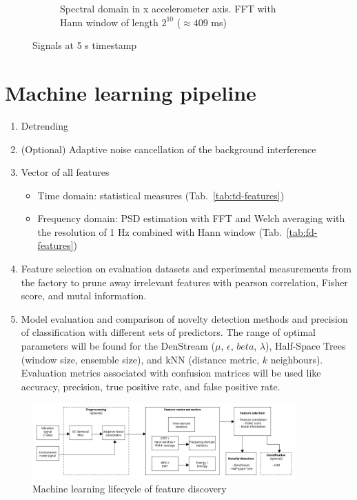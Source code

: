 \begin{figure}[ht]
\begin{subfigure}[b]{0.55\textwidth}
        \caption{Spectral domain in x accelerometer axis. FFT with Hann window of length $2^{10}$ ($\approx 409$ ms)}
    \end{subfigure} 
    \caption{Signals at 5 s timestamp}
\end{figure}






\newpage
\section{Machine learning pipeline}
\begin{enumerate}
    \itemsep0pt
    \item Detrending
    \item (Optional) Adaptive noise cancellation of the background interference
    \item Vector of all features
    \begin{itemize}
        \itemsep0pt
        \item Time domain: statistical measures (Tab.~\ref{tab:td-features})
        \item Frequency domain: PSD estimation with FFT and Welch averaging with the resolution of 1 Hz combined with Hann window (Tab.~\ref{tab:fd-features})
    \end{itemize}
    \item Feature selection on evaluation datasets and experimental measurements from the factory to prune away irrelevant features with pearson correlation, Fisher score, and mutal information.
    \item Model evaluation and comparison of novelty detection methods and precision of classification with different sets of predictors. The range of optimal parameters will be found for the DenStream ($\mu$, $\epsilon$, $beta$, $\lambda$), Half-Space Trees (window size, ensemble size), and kNN (distance metric, $k$ neighbours). Evaluation metrics associated with confusion matrices will be used like accuracy, precision, true positive rate, and false positive rate.
\end{enumerate}

\begin{figure}[h]
\centering
\includegraphics[width=0.9\textwidth]{assets/analysis/ml-lifecycle.png}
\caption{Machine learning lifecycle of feature discovery}
\end{figure}



